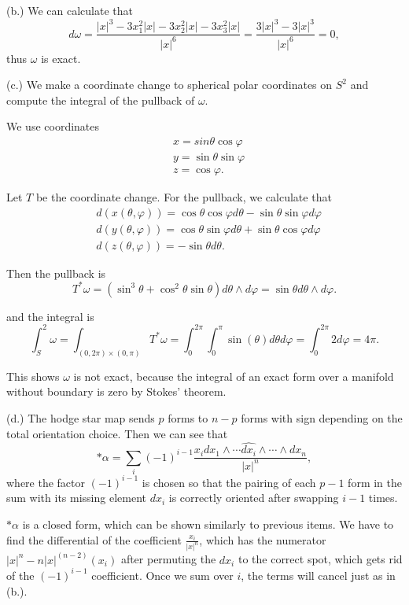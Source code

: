 \documentclass[11pt, reqno]{article}
\theoremstyle{plain}
\theoremstyle{definition}
\theoremstyle{remark}
\renewcommand{\phi}{\varphi}
\begin{document}
\begin{enumerate}
    (b.) We can calculate that
    \[
        d\omega = \frac{|x|^3 - 3x_1^2 |x| - 3x_2^2 |x| - 3x_3^2 |x|}{|x|^6} = 
        \frac{3|x|^3 - 3|x|^3}{|x|^6} = 0,
    \]
    thus $\omega$ is exact. 

    (c.) We make a coordinate change to spherical polar coordinates on $S^2$ and compute the integral
    of the pullback of $\omega$. 

    We use coordinates
    \begin{align*}
        & x = sin\theta \cos\phi\\
        & y = \sin\theta \sin\phi\\
        & z = \cos\phi.
    \end{align*}

    Let $T$ be the coordinate change. For the pullback, we calculate that 
    \begin{align*}
        & d(x(\theta, \phi)) = \cos\theta\cos\phi d\theta - \sin\theta\sin\phi d\phi\\
        & d(y(\theta, \phi)) = \cos\theta\sin\phi d\theta + \sin\theta\cos\phi d\phi\\
        & d(z(\theta, \phi)) = -\sin\theta d\theta.
    \end{align*}

    Then the pullback is 
    \[
        T^*\omega = (\sin^3 \theta + \cos^2\theta \sin\theta)d\theta \wedge d\phi = \sin\theta d\theta\wedge d\phi.
    \]

    and the integral is
    \[
        \int_S^2 \omega = \int_{(0,2\pi)\times (0,\pi)}T^*\omega = \int_0^{2\pi}\int_0^\pi \sin(\theta)d\theta d\phi
        = \int_0^{2\pi} 2 d\phi = 4\pi.
    \]

    This shows $\omega$ is not exact, because the integral of an exact form over a manifold without boundary
    is zero by Stokes' theorem.

    (d.) The hodge star map sends $p$ forms to $n-p$ forms with sign depending on the total orientation choice.
    Then we can see that 
    \[
        *\alpha = \sum_i (-1)^{i-1}\frac{x_i dx_1 \wedge \cdots \hat{dx_i}\wedge \cdots \wedge dx_n}{|x|^n},
    \]
    where the factor $(-1)^{i-1}$ is chosen so that the pairing of each $p-1$ form in the sum with its missing
    element $dx_i$ is correctly oriented after swapping $i-1$ times. 

    $*\alpha$ is a closed form, which can be shown similarly to previous items. We have to find the 
    differential of the coefficient $\frac{x_i}{|x|^n}$, which has the numerator $|x|^n - n |x|^(n-2)(x_i)$
    after permuting the $dx_i$ to the correct spot, which gets rid of the $(-1)^{i-1}$ coefficient. Once
    we sum over $i$, the terms will cancel just as in (b.). 


\end{enumerate}
\end{document}
